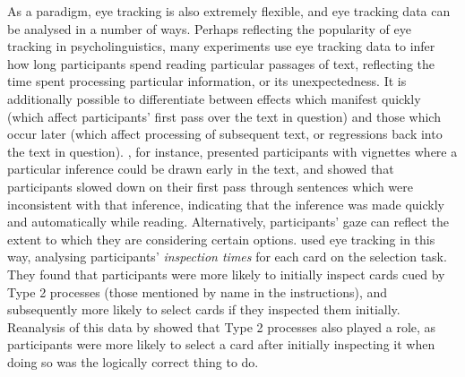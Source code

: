 As a paradigm, eye tracking is also extremely flexible,
and eye tracking data can be analysed in a number of ways.
Perhaps reflecting the popularity of eye tracking in psycholinguistics,
many experiments use eye tracking data
to infer how long participants spend reading particular passages of text,
reflecting the time spent processing particular information, or its unexpectedness.
It is additionally possible to differentiate between
effects which manifest quickly
(which affect participants' first pass over the text in question)
and those which occur later (which affect processing of subsequent text,
or regressions back into the text in question).
\citet{Haigh2014}, for instance,
presented participants with vignettes where
a particular inference could be drawn early in the text,
and showed that participants slowed down on their first pass through
sentences which were inconsistent with that inference,
indicating that the inference was made quickly and automatically while reading.
Alternatively, participants' gaze can reflect
the extent to which they are considering certain options.
\citet{Ball2003} used eye tracking in this way,
analysing participants' \emph{inspection times} for each card
on the \citet{Wason1968} selection task.
They found that participants were more likely
to initially inspect cards cued by Type 2 processes
(those mentioned by name in the instructions),
and subsequently more likely to select cards if they inspected them initially.
Reanalysis of this data by \citet{Evans2010}
showed that Type 2 processes also played a role,
as participants were more likely to select a card
after initially inspecting it when doing so was the logically correct thing to do.

